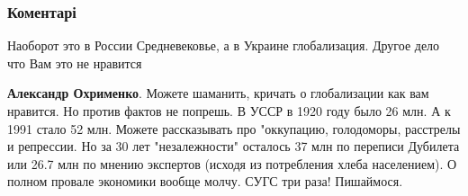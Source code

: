  
 
 
 
 
\subsubsection{Коментарі}

\begin{itemize} %

Наоборот это в России Средневековье, а в Украине глобализация. Другое дело что
Вам это не нравится

\begin{itemize} %
\textbf{Александр Охрименко}. Можете шаманить, кричать о глобализации как вам нравится. Но против фактов не попрешь.
В УССР в 1920 году было 26 млн. А к 1991 стало 52 млн. Можете рассказывать про "оккупацию, голодоморы, расстрелы и репрессии.
Но за 30 лет "незалежности" осталось 37 млн по переписи Дубилета или 26.7 млн по мнению экспертов (исходя из потребления хлеба населением). О полном провале экономики вообще молчу. СУГС три раза! Пишаймося.
\end{itemize} %

\end{itemize} %
